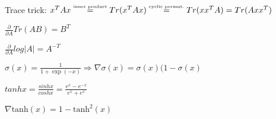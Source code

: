 \begin{inparaitem}[\color{red}\textbullet]
	\item Trace trick: $x^T A x \stackrel{\text{\tiny inner product}}{=} Tr(x^T A x) \stackrel{\text{\tiny cyclic permut.}}{=} Tr(x x^T A) = Tr(A x x^T)$ \\
	\item $\tfrac{\partial}{\partial A} Tr(AB) {=} B^T$
	\item $\frac{\partial}{\partial A} log|A| {=} A^{-T}$ \\
	\item $\sigma(x) = \frac{1}{1+\exp(-x)} \Rightarrow \nabla \sigma(x)=\sigma(x)(1-\sigma(x) $ \\
	\item $tanhx {=} \frac{sinhx}{coshx} {=} \frac{e^{x}-e^{-x}}{e^{x} + e^{x}}$
	\item $\nabla \text{tanh}(x) = 1-\text{tanh}^2(x)$ 

\end{inparaitem}

